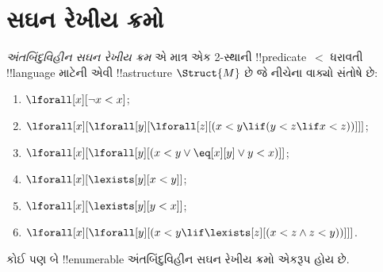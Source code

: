 \documentclass[../../../include/open-logic-section]{subfiles}
\begin{document}
\section{સઘન રેખીય ક્રમો}

\begin{defn}
  \emph{અંતબિંદુવિહીન સઘન રેખીય ક્રમ} એ માત્ર એક 2-સ્થાની
  !!{predicate}~$<$ ધરાવતી !!{language} માટેની એવી !!a{structure}
  $\Struct{M}$ છે જે નીચેના વાક્યો સંતોષે છે:
  \begin{enumerate}
  \item $\lforall[x][\lnot x < x]$;
  \item $\lforall[x][\lforall[y][\lforall[z][(x < y \lif (y < z \lif x
    <z ))]]]$;
  \item $\lforall[x][\lforall[y][(x< y \lor \eq[x][y] \lor y < x)]]$;
  \item $\lforall[x][\lexists[y][x < y]]$;
  \item $\lforall[x][\lexists[y][y < x]]$;
  \item $\lforall[x][\lforall[y][(x < y \lif \lexists[z][(x < z \land
        z < y))]]]$.
 \end{enumerate}
\end{defn}

\begin{thm}
  કોઈ પણ બે !!{enumerable} અંતબિંદુવિહીન સઘન રેખીય ક્રમો એકરૂપ હોય છે.
\end{thm}
\end{document}
